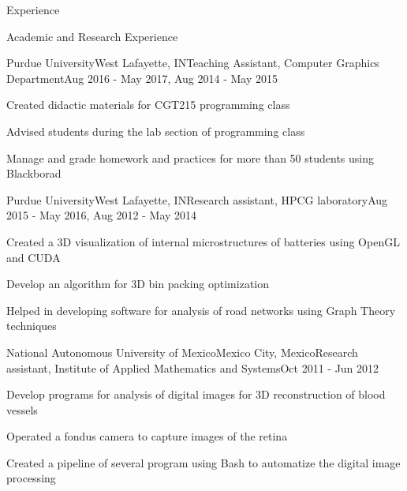 \documentclass{resume} %
\begin{document}
\begin{rSection}{Experience}

\end{rSection}

\clearpage



\begin{rSection}{Academic and Research Experience}

	\begin{rSubsection}{Purdue University}{West Lafayette, IN}{Teaching Assistant, Computer Graphics Department}{Aug 2016 - May 2017, Aug 2014 - May 2015}
	\item Created didactic materials for CGT215 programming class
	\item Advised students during the lab section of programming class
	\item Manage and grade homework and practices for more than 50 students using Blackborad
	\end{rSubsection}

	\begin{rSubsection}{Purdue University}{West Lafayette, IN}{Research assistant, HPCG laboratory}{Aug 2015 - May 2016, Aug 2012 - May 2014}
	\item Created a 3D visualization of internal microstructures of batteries using OpenGL and CUDA
	\item Develop an algorithm for 3D bin packing optimization
	\item Helped in developing software for analysis of road networks using Graph Theory techniques
	\end{rSubsection}
	
	\begin{rSubsection}{National Autonomous University of Mexico}{Mexico City, Mexico}{Research assistant, Institute of Applied Mathematics and Systems}{Oct 2011 - Jun 2012}
	\item Develop programs for analysis of digital images for 3D reconstruction of blood vessels
	\item Operated a fondus camera to capture images of the retina
	\item Created a pipeline of several program using Bash to automatize the digital image processing
	\end{rSubsection}
	

\end{rSection}
\end{document}
